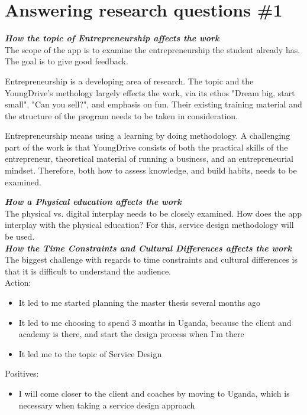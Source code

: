 \section{Answering research questions \#1}

\textbf{\textit{How the topic of Entrepreneurship affects the work}}\\
The scope of the app is to examine the entrepreneurship the student already has. The goal is to give good feedback.

Entrepreneurship is a developing area of research. The topic and the YoungDrive's methology largely effects the work, via its ethos "Dream big, start small", "Can you sell?", and emphasis on fun. Their existing training material and the structure of the program needs to be taken in consideration.

Entrepreneurship means using a learning by doing methodology. A challenging part of the work is that YoungDrive consists of both the practical skills of the entrepreneur, theoretical material of running a business, and an entrepreneurial mindset. Therefore, both how to assess knowledge, and build habits, needs to be examined.

\textbf{\textit{How a Physical education affects the work}}\\
The physical vs. digital interplay needs to be closely examined. How does the app interplay with the physical education? For this, service design methodology will be used. \\

\textbf{\textit{How the Time Constraints and Cultural Differences affects the work}}\\

The biggest challenge with regards to time constraints and cultural differences is that it is difficult to understand the audience.\\

Action:
\begin{itemize}
    \item It led to me started planning the master thesis several months ago
    \item It led to me choosing to spend 3 months in Uganda, because the client and academy is there, and start the design process when I'm there
    \item It led me to the topic of Service Design
\end{itemize}

Positives:
\begin{itemize}
    \item I will come closer to the client and coaches by moving to Uganda, which is necessary when taking a service design approach
\end{itemize}

